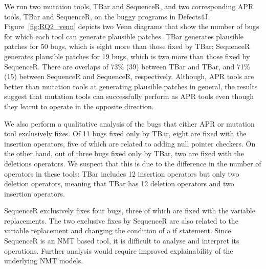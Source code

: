 \documentclass[conference]{IEEEtran}
\def\d4j{Defects4J\xspace}
\newcommand\inv[1]{#1\raisebox{1.15ex}{$\scriptscriptstyle-\!1$}}
\begin{document}
We run two mutation tools, \inv{TBar} and \inv{SequenceR}, and two corresponding
APR tools, TBar and SequenceR, on the buggy programs in \d4j.
Figure~\ref{fig:RQ2_venn} depicts two Venn diagrams that show the number of bugs
for which each tool can generate plausible patches. TBar generates plausible
patches for 50 bugs, which is eight more than those fixed by \inv{TBar};
SequenceR generates plausible patches for 19 bugs, which is two more than those
fixed by \inv{SequenceR}. There are overlaps of 73\% (39) between TBar and
\inv{TBar}, and 71\% (15) between SequenceR and \inv{SequenceR}, respectively.
Although, APR tools are better than mutation tools at generating plausible
patches in general, the results suggest that mutation tools can successfully
perform as APR tools even though they learnt to operate in the opposite
direction. 

We also perform a qualitative analysis of the bugs that
either APR or mutation tool exclusively fixes. Of 11 bugs fixed only by TBar,
eight are fixed with the insertion operators, five of which are related to adding
null pointer checkers. On the other hand, out of three bugs fixed only by
\inv{TBar}, two are fixed with the deletions operators. We suspect
that this is due to the difference in the number of operators in these tools:
TBar includes 12 insertion operators but only two deletion operators, meaning
that \inv{TBar} has 12 deletion operators and two insertion operators.

SequenceR exclusively fixes four bugs, three of which are fixed with the
variable replacements. The two exclusive fixes by \inv{SequenceR} are also related
to the variable replacement and changing the condition of a if statement. Since
SequenceR is an NMT based tool, it is difficult to analyse and interpret its
operations. Further analysis would require improved explainability of the
underlying NMT models.



\end{document}
